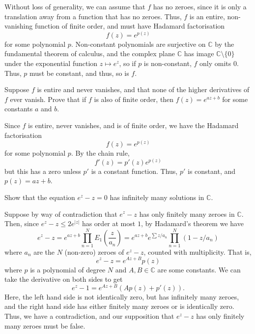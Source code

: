 \documentclass[12 pt, letterpaper]{hmcpset}
\begin{document}
\begin{solution} 
	Without loss of generality, we can assume that $f$ has no zeroes, since it is only a translation away from a function that has no zeroes. Thus, $f$ is an entire, non-vanishing function of finite order, and must have Hadamard factorisation
	\[
		f(z) = e^{p(z)}
	\]
	for some polynomial $p$. Non-constant polynomials are surjective on $\mathbb{C}$ by the fundamental theorem of calculus, and the complex plane $\mathbb{C}$ has image $\mathbb{C} \setminus \{ 0 \}$ under the exponential function $z \mapsto e^{z}$, so if $p$ is non-constant, $f$ only omits $0$. Thus, $p$ must be constant, and thus, so is $f$.
\end{solution}

\pagebreak

\begin{problem}[12.]
	Suppose $f$ is entire and never vanishes, and that none of the higher derivatives of $f$ ever vanish. Prove that if $f$ is also of finite order, then $f(z) = e^{az + b}$ for some constants $a$ and $b$.
\end{problem}

\begin{solution}
	Since $f$ is entire, never vanishes, and is of finite order, we have the Hadamard factorisation
	\[
		f(z) = e^{p(z)}
	\]
	for some polynomial $p$. By the chain rule,
	\[
		f'(z) = p'(z) e^{p(z)}
	\]
	but this has a zero unless $p'$ is a constant function. Thus, $p'$ is constant, and $p(z) = az + b$.
\end{solution}

\pagebreak

\begin{problem}[13.]
	Show that the equation $e^{z} - z = 0$ has infinitely many solutions in $\mathbb{C}$.
\end{problem}

\begin{solution}
	Suppose by way of contradiction that $e^{z} - z$ has only finitely many zeroes in $\mathbb{C}$. Then, since $e^{z} - z \le 2 e^{\lvert z \rvert}$ has order at most $1$, by Hadamard's theorem we have
	\[
		e^{z} - z = e^{az + b} \prod_{n = 1}^{N} E_{1} \left ( \frac{z}{a_{n}} \right ) = e^{az + b} e^{\sum z / a_{n}} \prod_{n = 1}^{N} (1 - z / a_{n})
	\]
	where $a_{n}$ are the $N$ (non-zero) zeroes of $e^{z} - z$, counted with multiplicity. That is,
	\[
		e^{z} - z = e^{A z + B} p(z)
	\]
	where $p$ is a polynomial of degree $N$ and $A, B \in \mathbb{C}$ are some constants. We can take the derivative on both sides to get
	\[
		e^{z} - 1 = e^{Az + B} (A p(z) + p'(z)).
	\]
	Here, the left hand side is not identically zero, but has infinitely many zeroes, and the right hand side has either finitely many zeroes or is identically zero. Thus, we have a contradiction, and our supposition that $e^{z} - z$ has only finitely many zeroes must be false.
\end{solution}
\end{document}
